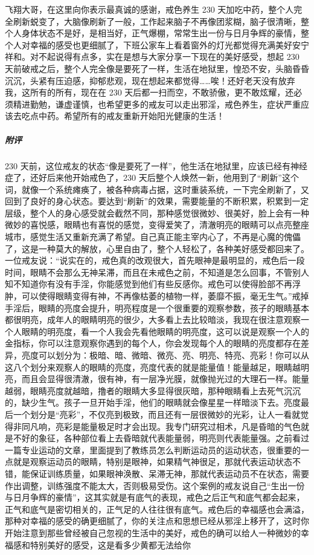 \begin{case}
\end{case}

\begin{case}
    飞翔大哥，在这里向你表示最真诚的感谢，戒色养生 230 天加吃中药，整个人完全刷新蜕变了，大脑像刷新了一般，工作起来脑子不再像团浆糊，脑子很清晰，整个人身体状态不是好，是相当好，正气爆棚，常常生出一份与日月争辉的豪情，整个人对幸福的感受也更细腻了，下班公家车上看着窗外的灯光都觉得充满美好安宁祥和。对不起说得有点多，实在是想与大家分享一下现在的美好感受，想起 230 天前破戒之后，整个人完全像是要死了一样，生活在地狱里，惶恐不安，头脑昏昏沉沉，头紧有压迫感，抑郁悲观，现在想起来都觉得……唉！还好老天没有放弃我，这所有的所有，现在在 230 天后都一扫而空，不敢骄傲，更不敢炫耀，还必须精进勤勉，谦虚谨慎，也希望更多的戒友可以走出邪淫，戒色养生，症状严重应该去吃点中药。希望所有的戒友重新开始阳光健康的生活！
    \subparagraph{附评} 230 天前，这位戒友的状态“像是要死了一样”，他生活在地狱里，应该已经有神经症了，还好后来他开始戒色了，230 天后整个人焕然一新，他用到了“刷新”这个词，就像一个系统瘫痪了，被各种病毒占据，这时重装系统，一下完全刷新了，又回到了良好的身心状态。要达到“刷新”的效果，需要能量的不断积累，积累到一定层级，整个人的身心感受就会截然不同，那种感觉很微妙、很美好，脸上会有一种微妙的喜悦感，眼睛也有喜悦的感觉，变得爱笑了，清澈明亮的眼睛可以点亮整座城市，感觉生活又重新充满了希望。自己真正能主宰内心了，不再是心魔的傀儡了，这是一种莫大的解放，心里自由了，整个人轻松了，各种美好感受都回来了。一位戒友说：“说实在的，戒色真的改观很大，首先眼神是最明显的，戒色后一段时间，眼睛不会那么无神呆滞，而且在未戒色之前，不知道是怎么回事，不管别人知不知道你有没有手淫，你能感觉到他们有些反感你。戒色可以使得脸部不再浮肿，可以使得眼睛变得有神，不再像枯萎的植物一样，萎靡不振，毫无生气。”戒掉手淫后，眼睛的亮度会提升，明亮程度是一个很重要的观察参数，孩子的眼睛基本都很明亮，成年人的眼睛明亮的很少，大多看上去比较暗淡，我现在很注意观察一个人眼睛的明亮度，看一个人我会先看他眼睛的明亮度，这可以说是观察一个人的金指标，你可以注意观察你遇到的每个人，你会发现每个人的眼睛的亮度都存在差异，亮度可以划分为：极暗、暗、微暗、微亮、亮、明亮、特亮、亮彩！你可以从这八个划分来观察人的眼睛的亮度，亮度代表的就是能量值！能量越足，眼睛越明亮，而且会显得很清澈，很有神，有一层净光膜，就像抛光过的大理石一样。能量越弱，眼睛亮度就越暗，撸者的眼睛大多显得很灰暗，那种眼睛看上去死气沉沉的，缺少生气。孩子一旦开始手淫，他们的眼睛就会像星星一样暗淡下去。亮度最后一个划分是“亮彩”，不仅亮到极致，而且还有一层很微妙的光彩，让人一看就觉得非同凡响，亮彩是能量极足时才会出现。我专门研究过相术，凡是昏暗的气色就是不好的象征，各种部位看上去昏暗就代表能量弱，明亮则代表能量强。之前看过一篇专业运动的文章，里面提到了教练员怎么判断运动员的运动状态，很重要的一点就是观察运动员的眼睛，特别是眼神，如果精气神很足，那就代表运动状态不错，能保证训练质量，如果眼神涣散、呆滞无神，那就代表运动员不在状态，需要作出调整，训练强度不能太大，否则极易受伤。这个案例的戒友说自己“生出一份与日月争辉的豪情”，这其实就是有底气的表现，戒色之后正气和底气都会起来，正气和底气是密切相关的，正气足的人往往很有底气。戒色后的幸福感也会满溢，那种对幸福的感受的确更细腻了，你的关注点和思想已经从邪淫上移开了，这时你开始注意到那些曾经被自己忽视的生活中的美好，戒色的确可以给人一种微妙的幸福感和特别美好的感受，这是看多少黄都无法给你
\end{case}
